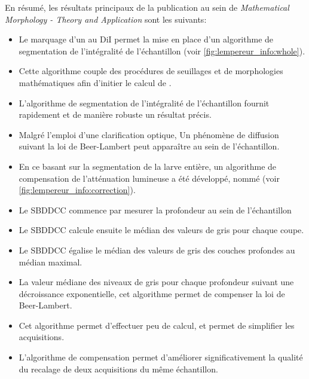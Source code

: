 \documentclass[\main/main.tex]{subfiles}
\begin{document}
En résumé, les résultats principaux de la publication au sein de
\emph{Mathematical Morphology - Theory and Application} sont les suivants:
\begin{itemize}
    \item 
    Le marquage d'un \pz{} au DiI permet la mise en place
    d'un algorithme de segmentation de l'intégralité de l'échantillon (voir \autoref{fig:lempereur_info:whole}).
    
    \item
    Cette algorithme couple des procédures de seuillages et de morphologies mathématiques 
    afin d'initier le calcul de \watersheds.
    
    \item
    L'algorithme de segmentation de l'intégralité de l'échantillon fournit
    rapidement et de manière robuste un résultat précis.
    
    \item
    Malgré l'emploi d'une clarification optique,
    Un phénomène de diffusion suivant la loi de Beer-Lambert peut apparaître au sein de l'échantillon.
    
    \item
    En ce basant sur la segmentation de la larve entière,
    un algorithme de compensation de l'atténuation lumineuse a été développé, nommé \sbddcc 
    (voir \autoref{fig:lempereur_info:correction}).
    
    \item
    Le SBDDCC commence par mesurer la profondeur au sein de l'échantillon
    
    \item
    Le SBDDCC calcule ensuite le médian des valeurs de gris pour chaque coupe.
    
    \item
    Le SBDDCC égalise le médian des valeurs de gris des couches profondes au médian maximal.
    
    \item
    La valeur médiane des niveaux de gris pour chaque profondeur suivant une décroissance exponentielle,
    cet algorithme permet de compenser la loi de Beer-Lambert.
    
    \item
    Cet algorithme permet d'effectuer peu de calcul, et permet de simplifier les acquisitions.
    
    \item
    L'algorithme de compensation permet d'améliorer significativement 
    la qualité du recalage de deux acquisitions du même échantillon.
    

\end{itemize}
\end{document}
